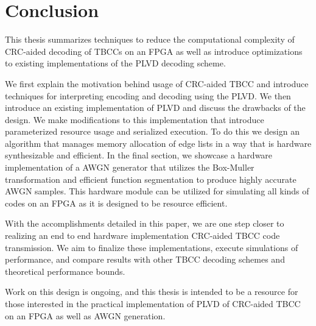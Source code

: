 
\chapter{Conclusion}
This thesis summarizes techniques to reduce the computational complexity of CRC-aided decoding of TBCCs on an FPGA as well as introduce optimizations to existing implementations of the PLVD decoding scheme. 

We first explain the motivation behind usage of CRC-aided TBCC and introduce techniques for interpreting encoding and decoding using the PLVD. We then introduce an existing implementation of PLVD and discuss the drawbacks of the design. We make modifications to this implementation that introduce parameterized resource usage and serialized execution. To do this we design an algorithm that manages memory allocation of edge lists in a way that is hardware synthesizable and efficient. 
In the final section, we showcase a hardware implementation of a AWGN generator that utilizes the Box-Muller transformation and efficient function segmentation to produce highly accurate AWGN samples. This hardware module can be utilized for simulating all kinds of codes on an FPGA as it is designed to be resource efficient.

With the accomplishments detailed in this paper, we are one step closer to realizing an end to end hardware implementation CRC-aided TBCC code transmission. We aim to finalize these implementations, execute simulations of performance, and compare results with other TBCC decoding schemes and theoretical performance bounds.

Work on this design is ongoing, and this thesis is intended to be a resource for those interested in the practical implementation of PLVD of CRC-aided TBCC on an FPGA as well as AWGN generation. 
